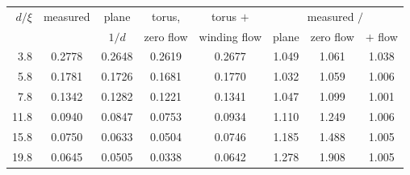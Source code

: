 \begin{tabular}{@{}rccccccc@{}}
\toprule
$d/\xi$ & measured & plane & torus, & torus $+$ & \multicolumn{3}{c}{measured $/$}\\
 & & $1/d$ & zero flow & winding flow & plane & zero flow & $+$ flow\\
\midrule
3.8 & 0.2778 & 0.2648 & 0.2619 & 0.2677 & 1.049 & 1.061 & 1.038\\
5.8 & 0.1781 & 0.1726 & 0.1681 & 0.1770 & 1.032 & 1.059 & 1.006\\
7.8 & 0.1342 & 0.1282 & 0.1221 & 0.1341 & 1.047 & 1.099 & 1.001\\
11.8 & 0.0940 & 0.0847 & 0.0753 & 0.0934 & 1.110 & 1.249 & 1.006\\
15.8 & 0.0750 & 0.0633 & 0.0504 & 0.0746 & 1.185 & 1.488 & 1.005\\
19.8 & 0.0645 & 0.0505 & 0.0338 & 0.0642 & 1.278 & 1.908 & 1.005\\
\bottomrule
\end{tabular}
